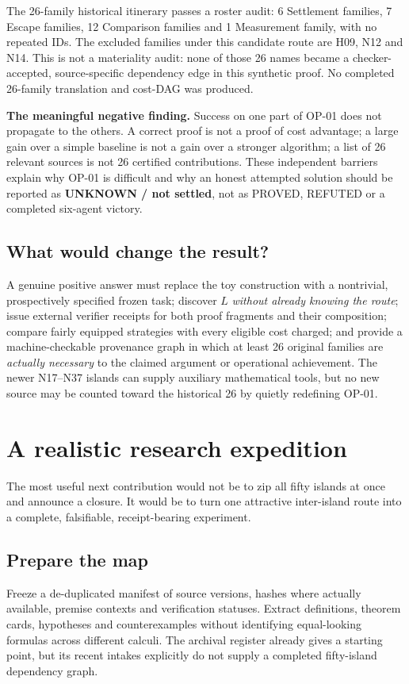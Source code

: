 \documentclass[11pt,letterpaper,oneside]{article}
\begin{document}
The 26-family historical itinerary passes a roster audit: 6 Settlement families, 7 Escape families, 12 Comparison families and 1 Measurement family, with no repeated IDs. The excluded families under this candidate route are H09, N12 and N14. This is not a materiality audit: none of those 26 names became a checker-accepted, source-specific dependency edge in this synthetic proof. No completed 26-family translation and cost-DAG was produced.

\begin{insight}
\textbf{The meaningful negative finding.} Success on one part of OP-01 does not propagate to the others. A correct proof is not a proof of cost advantage; a large gain over a simple baseline is not a gain over a stronger algorithm; a list of 26 relevant sources is not 26 certified contributions. These independent barriers explain why OP-01 is difficult and why an honest attempted solution should be reported as \textbf{UNKNOWN / not settled}, not as PROVED, REFUTED or a completed six-agent victory.
\end{insight}

\subsection{What would change the result?}
A genuine positive answer must replace the toy construction with a nontrivial, prospectively specified frozen task; discover $L$ \emph{without already knowing the route}; issue external verifier receipts for both proof fragments and their composition; compare fairly equipped strategies with every eligible cost charged; and provide a machine-checkable provenance graph in which at least 26 original families are \emph{actually necessary} to the claimed argument or operational achievement. The newer N17--N37 islands can supply auxiliary mathematical tools, but no new source may be counted toward the historical 26 by quietly redefining OP-01.

\section{A realistic research expedition}
The most useful next contribution would not be to zip all fifty islands at once and announce a closure. It would be to turn one attractive inter-island route into a complete, falsifiable, receipt-bearing experiment.

\subsection{Prepare the map}
Freeze a de-duplicated manifest of source versions, hashes where actually available, premise contexts and verification statuses. Extract definitions, theorem cards, hypotheses and counterexamples without identifying equal-looking formulas across different calculi. The archival register already gives a starting point, but its recent intakes explicitly do not supply a completed fifty-island dependency graph.
\end{document}
